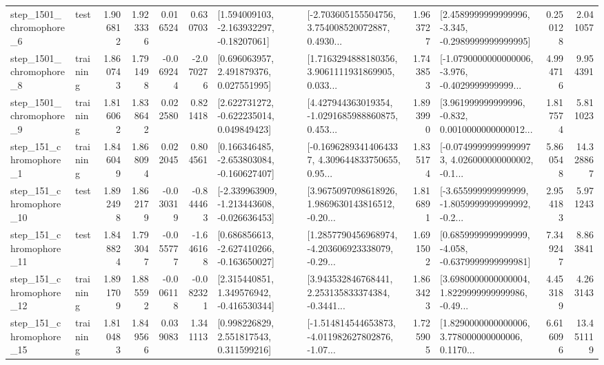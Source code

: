 \begin{tabular}{llrrrrllrlrr}
  step\_1501\_chromophore\_6 &      test &      1.906812 &    1.923336 &      0.016524 &  0.630703 &    [1.594009103, -2.163932297, -0.18207061] &  [-2.703605155504756, 3.754008520072887, 0.4930... &       1.963727 &  [2.4589999999999996, -3.345, -0.2989999999999995] &            0.250128 &          2.041057 \\
  step\_1501\_chromophore\_8 &  training &      1.860743 &    1.791498 &     -0.069244 & -2.070276 &     [0.696063957, 2.491879376, 0.027551995] &  [1.7163294888180356, 3.9061111931869905, 0.033... &       1.743853 &  [-1.0790000000000006, -3.976, -0.4029999999999... &            4.994716 &          9.954391 \\
  step\_1501\_chromophore\_9 &  training &      1.816062 &    1.838642 &      0.022580 &  0.821418 &    [2.622731272, -0.622235014, 0.049849423] &  [4.427944363019354, -1.0291685988860875, 0.453... &       1.893990 &  [3.961999999999996, -0.832, 0.0010000000000012... &            1.817574 &          5.811023 \\
   step\_151\_chromophore\_1 &  training &      1.846049 &    1.868094 &      0.022045 &  0.804561 &   [0.166346485, -2.653803084, -0.160627407] &  [-0.16962893414064337, 4.309644833750655, 0.95... &       1.835174 &  [-0.07499999999999973, 4.026000000000002, -0.1... &            5.860548 &         14.328867 \\
  step\_151\_chromophore\_10 &      test &      1.892498 &    1.862179 &     -0.030319 & -0.844463 &  [-2.339963909, -1.213443608, -0.026636453] &  [3.9675097098618926, 1.9869630143816512, -0.20... &       1.816891 &  [-3.655999999999999, -1.8059999999999992, -0.2... &            2.954183 &          5.971243 \\
  step\_151\_chromophore\_11 &      test &      1.848824 &    1.793047 &     -0.055777 & -1.646168 &   [0.686856613, -2.627410266, -0.163650027] &  [1.2857790456968974, -4.203606923338079, -0.29... &       1.691502 &  [0.6859999999999999, -4.058, -0.6379999999999981] &            7.349247 &          8.863841 \\
  step\_151\_chromophore\_12 &  training &      1.891709 &    1.885592 &     -0.006118 & -0.082321 &    [2.315440851, 1.349576942, -0.416530344] &  [3.943532846768441, 2.253135833374384, -0.3441... &       1.863423 &  [3.6980000000000004, 1.8229999999999986, -0.49... &            4.453189 &          4.263143 \\
  step\_151\_chromophore\_15 &  training &      1.810483 &    1.849566 &      0.039083 &  1.341113 &     [0.998226829, 2.551817543, 0.311599216] &  [-1.514814544653873, -4.011982627802876, -1.07... &       1.725905 &  [1.8290000000000006, 3.778000000000006, 0.1170... &            6.616096 &         13.451119 \\

\end{tabular}
